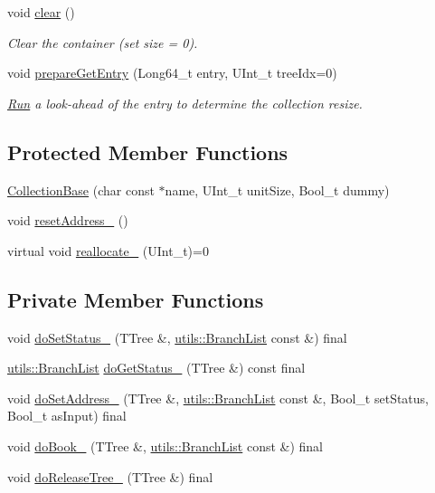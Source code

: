 \begin{DoxyCompactItemize}
void \hyperlink{classpanda_1_1CollectionBase_a5820623424a01aa34f3988ead2612576}{clear} ()
\begin{DoxyCompactList}\small\item\em Clear the container (set size = 0). \item\end{DoxyCompactList}\item 
void \hyperlink{classpanda_1_1CollectionBase_a217c39578bc5e0e7e2b6ebf44bf93cdd}{prepareGetEntry} (Long64\_\-t entry, UInt\_\-t treeIdx=0)
\begin{DoxyCompactList}\small\item\em \hyperlink{classpanda_1_1Run}{Run} a look-\/ahead of the entry to determine the collection resize. \item\end{DoxyCompactList}\end{DoxyCompactItemize}
\subsection*{Protected Member Functions}
\begin{DoxyCompactItemize}
\item 
\hyperlink{classpanda_1_1CollectionBase_a4037f99dc89bcd8f3e89bea5fbec3a2c}{CollectionBase} (char const $\ast$name, UInt\_\-t unitSize, Bool\_\-t dummy)
\item 
void \hyperlink{classpanda_1_1CollectionBase_a4d6bc9cc77ee3e29840362826b108b23}{resetAddress\_\-} ()
\item 
virtual void \hyperlink{classpanda_1_1CollectionBase_a89b2268e4b665eb8f1fa5b54d4c61c32}{reallocate\_\-} (UInt\_\-t)=0
\end{DoxyCompactItemize}
\subsection*{Private Member Functions}
\begin{DoxyCompactItemize}
\item 
void \hyperlink{classpanda_1_1CollectionBase_ac615b3ca8e0c3acdab38196bcad23027}{doSetStatus\_\-} (TTree \&, \hyperlink{classpanda_1_1utils_1_1BranchList}{utils::BranchList} const \&) final
\item 
\hyperlink{classpanda_1_1utils_1_1BranchList}{utils::BranchList} \hyperlink{classpanda_1_1CollectionBase_a885ed7e0cd0d0f37f913db20597fcd3c}{doGetStatus\_\-} (TTree \&) const final
\item 
void \hyperlink{classpanda_1_1CollectionBase_a2bd8c03841337f83ccdb4279ebf1f24d}{doSetAddress\_\-} (TTree \&, \hyperlink{classpanda_1_1utils_1_1BranchList}{utils::BranchList} const \&, Bool\_\-t setStatus, Bool\_\-t asInput) final
\item 
void \hyperlink{classpanda_1_1CollectionBase_a55e90bbac83f59d93a938dbe57c871c0}{doBook\_\-} (TTree \&, \hyperlink{classpanda_1_1utils_1_1BranchList}{utils::BranchList} const \&) final
\item 
void \hyperlink{classpanda_1_1CollectionBase_ac9d4543501718f3fa96366e43fde46bc}{doReleaseTree\_\-} (TTree \&) final
\end{DoxyCompactItemize}



